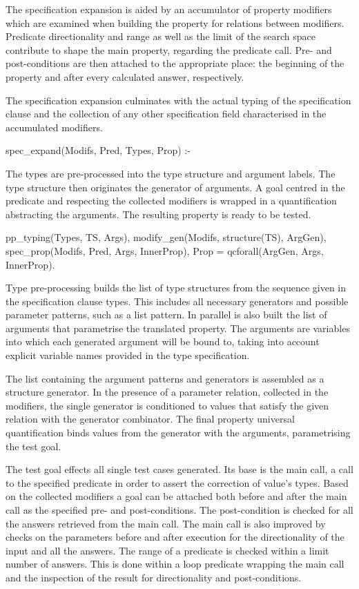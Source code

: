 The specification expansion is aided by an accumulator of property
modifiers which are examined when building the property for relations
between modifiers.
%
Predicate directionality and range as well as the limit of the search
space contribute to shape the main property, regarding the predicate
call.
%
Pre- and post-conditions are then attached to the appropriate place: the
beginning of the property and after every calculated answer,
respectively.


The specification expansion culminates with the actual typing of the
specification clause and the collection of any other specification field
characterised in the accumulated modifiers.
%
\begin{yapcode}
 spec_expand(Modifs, Pred, Types, Prop) :-
\end{yapcode}
%
The types are pre-processed into the type structure and argument labels.
%
The type structure then originates the generator of arguments.
%
A goal centred in the predicate and respecting the collected modifiers
is wrapped in a quantification abstracting the arguments.
%
The resulting property is ready to be tested.
%
\begin{yapcode}
   pp_typing(Types, TS, Args),
   modify_gen(Modifs, structure(TS), ArgGen),
   spec_prop(Modifs, Pred, Args, InnerProp),
   Prop = qcforall(ArgGen, Args, InnerProp).
\end{yapcode}



Type pre-processing builds the list of type structures from the sequence
given in the specification clause types.
%
This includes all necessary generators and possible parameter patterns,
such as a list pattern.
%
In parallel is also built the list of arguments that parametrise the
translated property.
%
The arguments are variables into which each generated argument will be
bound to, taking into account explicit variable names provided in the
type specification.



The list containing the argument patterns and generators is assembled
as a structure generator.
%
In the presence of a parameter relation, collected in the modifiers, the
single generator is conditioned to values that satisfy the given
relation with the  generator combinator.
%
The final property universal quantification binds values from the
generator with the arguments, parametrising the test goal.



The test goal effects all single test cases generated.
%
Its base is the main call, a call to the specified predicate in order to
assert the correction of value's types.
%
Based on the collected modifiers a goal can be attached both before and
after the main call as the specified pre- and post-conditions.
%
The post-condition is checked for all the answers retrieved from the
main call.
%
The main call is also improved by checks on the parameters before and
after execution for the directionality of the input and all the answers.
%
The range of a predicate is checked within a limit number of answers.
%
This is done within a loop predicate wrapping the main call and the
inspection of the result for directionality and post-conditions.


